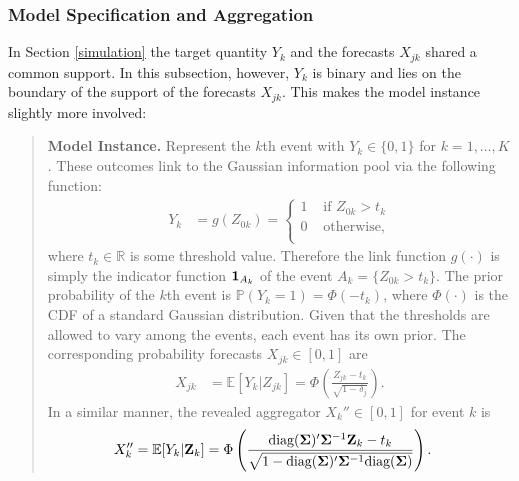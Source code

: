 \documentclass[11pt]{article}
\newcommand{\R}{\mathbb{R}}
\renewcommand{\P}{\mathbb{P}}
\newcommand{\E}{\mathbb{E}}
\theoremstyle{definition}
\theoremstyle{definition}
\def\one{{\bf 1}}
\def\bSigma{{\bf \Sigma}}
\def\Z{{\bf Z}}
\def\P{{\mathbb P}}
\def\E{{\mathbb E}}
\def\diag{\text{diag}}
\def\diag{\text{diag}}
\begin{document}
\subsubsection{Model Specification and Aggregation}
In Section \ref{simulation} the target quantity $Y_k$ and the forecasts $X_{jk}$ shared a common support. In this subsection, however, $Y_k$ is binary and lies on the boundary of the support of the forecasts $X_{jk}$. This makes the model instance slightly more involved:

\begin{quote}
\textbf{Model Instance.} Represent the $k$th event with $Y_k \in \{0,1\}$ for $k = 1, \dots, K$. These outcomes link to the Gaussian information pool via the following function:
\begin{align*}
Y_k &= g(Z_{0k}) = \begin{cases}
1 & \text{ if } Z_{0k} > t_k\\
0 & \text{ otherwise},\\
\end{cases}
\end{align*}
where $t_k \in \R$ is some threshold value. Therefore the link function $g(\cdot)$ is simply the indicator function $\one_{A_k}$ of the event $A_k = \{Z_{0k} > t_k\}$. The prior probability of the $k$th event is $\P(Y_k = 1) = \Phi(-t_k)$, where $\Phi(\cdot)$ is the CDF of a standard Gaussian distribution. Given that the thresholds are allowed to vary among the events, each event has its own prior. 
The corresponding probability forecasts $X_{jk} \in [0,1]$ are
\begin{align*}
X_{jk} &= \E[Y_k | Z_{jk}] = \Phi\left( \frac{Z_{jk} - t_k}{\sqrt{1-\delta_j}}\right).
\end{align*}
In a similar manner, 
 the revealed aggregator $X_k'' \in [0,1]$ for event $k$ is
\begin{align}
X_{k}'' &= \E[Y_k | \Z_k] = \Phi\left( \frac{\diag(\bSigma)'\bSigma^{-1}\Z_k - t_k}{\sqrt{1-\diag(\bSigma)'\bSigma^{-1}\diag(\bSigma)}}\right). \label{RevAgg}
\end{align}
\end{quote}
\end{document}
